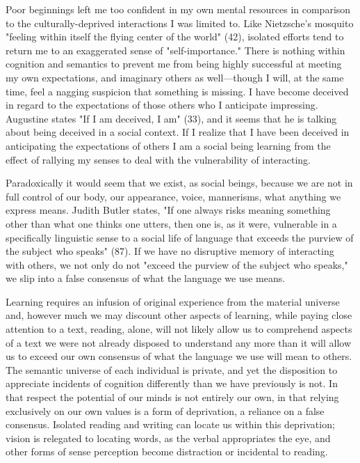 \documentclass[
]{memoir}
\begin{document}
Poor beginnings left me too confident in my own mental resources in
comparison to the culturally-deprived interactions I was limited to.
Like Nietzsche's mosquito "feeling within itself the flying center of
the world" (42), isolated efforts tend to return me to an exaggerated
sense of "self-importance." There is nothing within cognition and
semantics to prevent me from being highly successful at meeting my own
expectations, and imaginary others as well---though I will, at the same
time, feel a nagging suspicion that something is missing. I have become
deceived in regard to the expectations of those others who I anticipate
impressing. Augustine states "If I am deceived, I am" (33), and it seems
that he is talking about being deceived in a social context. If I
realize that I have been deceived in anticipating the expectations of
others I am a social being learning from the effect of rallying my
senses to deal with the vulnerability of interacting.

Paradoxically it would seem that we exist, as social beings, because we
are not in full control of our body, our appearance, voice, mannerisms,
what anything we express means. Judith Butler states, "If one always
risks meaning something other than what one thinks one utters, then one
is, as it were, vulnerable in a specifically linguistic sense to a
social life of language that exceeds the purview of the subject who
speaks" (87). If we have no disruptive memory of interacting with
others, we not only do not "exceed the purview of the subject who
speaks," we slip into a false consensus of what the language we use
means.

Learning requires an infusion of original experience from the material
universe and, however much we may discount other aspects of learning,
while paying close attention to a text, reading, alone, will not likely
allow us to comprehend aspects of a text we were not already disposed to
understand any more than it will allow us to exceed our own consensus of
what the language we use will mean to others. The semantic universe of
each individual is private, and yet the disposition to appreciate
incidents of cognition differently than we have previously is not. In
that respect the potential of our minds is not entirely our own, in that
relying exclusively on our own values is a form of deprivation, a
reliance on a false consensus. Isolated reading and writing can locate
us within this deprivation; vision is relegated to locating words, as
the verbal appropriates the eye, and other forms of sense perception
become distraction or incidental to reading.
\end{document}
